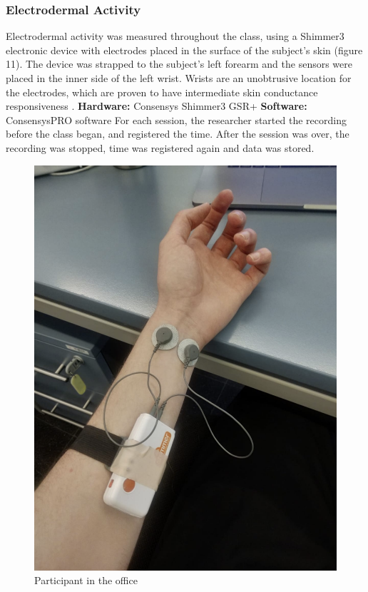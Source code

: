 \subsubsection{Electrodermal Activity}
Electrodermal activity was measured throughout the class, using a Shimmer3 electronic device with electrodes placed in the surface of the subject's skin (figure 11). The device was strapped to the subject's left forearm and the sensors were placed in the inner side of the left wrist. Wrists are an unobtrusive location for the electrodes, which are proven to have intermediate skin conductance responsiveness \cite{vandooren_de}.
\textbf{Hardware:} Consensys Shimmer3 GSR+
\textbf{Software:} ConsensysPRO software \cite{shimmer}
For each session, the researcher started the recording before the class began, and registered the time. After the session was over, the recording was stopped, time was registered again and data was stored.
\begin{figure}[!h]
    \includegraphics[clip,width=\columnwidth]{Figures/shimmer.png}%
\caption{Participant in the office}
\label{fig:environment}
\end{figure}

